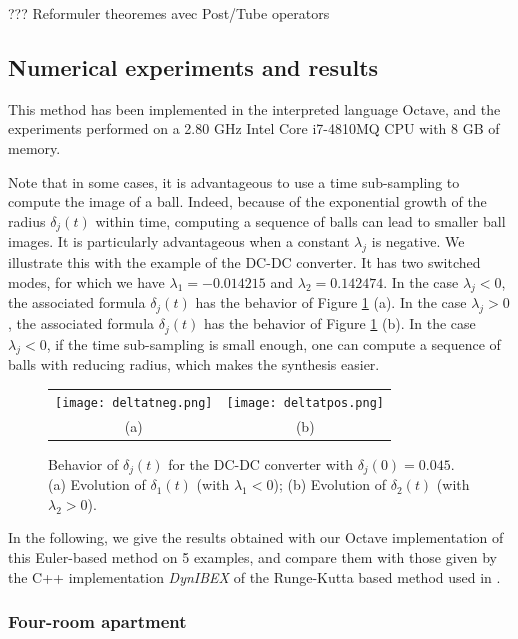 {\todo ??? Reformuler theoremes avec Post/Tube operators}




\subsection{Numerical experiments and results}
\label{sec:experiment}
This method has been implemented in the interpreted language Octave, 
and the experiments performed on a 2.80 GHz Intel Core i7-4810MQ CPU with 8 GB
of memory.



Note that in some cases, it is advantageous to use a time sub-sampling to compute the image of a ball.
Indeed, because of the exponential growth of the radius $\delta_j(t)$ within time,
computing a sequence of balls can lead to smaller ball images. 
It is particularly advantageous when a constant $\lambda_j$ is negative.
We illustrate this with the example of the DC-DC converter. 
It has two switched modes, for which we have $\lambda_1 = -0.014215$
and $\lambda_2 = 0.142474$. 
In the case $\lambda_j < 0$, the associated formula $\delta_j(t)$ has the behavior 
of Figure \ref{fig:delta_t_pos} (a). 
In the case $\lambda_j > 0$, the associated formula $\delta_j(t)$ has the behavior 
of Figure \ref{fig:delta_t_pos} (b). In the case $\lambda_j < 0$, 
if the time sub-sampling is small enough, 
one can compute a sequence of balls with reducing radius, which makes the synthesis easier. 

\begin{figure}[h]
\centering
\begin{tabular}{cc}
\texttt{[image: deltatneg.png]} & \texttt{[image: deltatpos.png]} \\
(a) & (b)
\end{tabular}
 \caption{Behavior of $\delta_j(t)$ for the DC-DC converter with $\delta_j(0) = 0.045$. 
 (a) Evolution of $\delta_1(t)$ (with $\lambda_1<0$); 
 (b) Evolution of $\delta_2(t)$ (with $\lambda_2>0$). }
  \label{fig:delta_t_pos}
 \end{figure}

In the following, we give the results obtained with our Octave implementation 
of this Euler-based method on 5 examples, and compare them with those 
given by the C++ implementation {\em DynIBEX} \cite{dynibex} of the Runge-Kutta based 
method used in \cite{NL_minimator}.


 \subsubsection{Four-room apartment}
 \label{sec:four_room}
 
